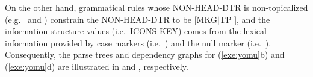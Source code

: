 

\noindent On the other hand, grammatical rules whose NON-HEAD-DTR is
non-topicalized (e.g.\  and ) constrain
the NON-HEAD-DTR to be [MKG{$\mid$}TP ], and the
information structure values (i.e.\ ICONS-KEY)
comes from the lexical information provided by case markers
(i.e.\ ) and the null marker
(i.e.\ ). Consequently, the parse trees and dependency
graphs for (\ref{exe:yomu}b) and (\ref{exe:yomu}d) are illustrated in
 and
, respectively.



